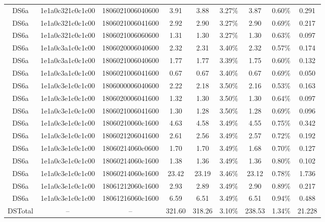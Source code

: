 \begin{tabular}{|c|c c|c|c c|c c|c|}
  DS6a & 1e1a0c321c0c1c00 & 1806021006040600 & 3.91 & 3.88 & 3.27\% & 3.87 & 0.60\% & 0.291 \\
  DS6a & 1e1a0c321c0c1c00 & 1806021006041600 & 2.92 & 2.90 & 3.27\% & 2.90 & 0.69\% & 0.217 \\
  DS6a & 1e1a0c321c0c1c00 & 1806021006060600 & 1.31 & 1.30 & 3.27\% & 1.30 & 0.63\% & 0.097 \\
  DS6a & 1e1a0c3a1c0c1c00 & 1806020006040600 & 2.32 & 2.31 & 3.40\% & 2.32 & 0.57\% & 0.174 \\
  DS6a & 1e1a0c3a1c0c1c00 & 1806021006040600 & 1.77 & 1.77 & 3.39\% & 1.75 & 0.60\% & 0.132 \\
  DS6a & 1e1a0c3a1c0c1c00 & 1806021006041600 & 0.67 & 0.67 & 3.40\% & 0.67 & 0.69\% & 0.050 \\
  DS6a & 1e1a0c3e1c0c1c00 & 1806000006040600 & 2.22 & 2.18 & 3.50\% & 2.16 & 0.53\% & 0.163 \\
  DS6a & 1e1a0c3e1c0c1c00 & 1806020006041600 & 1.32 & 1.30 & 3.50\% & 1.30 & 0.64\% & 0.097 \\
  DS6a & 1e1a0c3e1c0c1c00 & 1806021006041600 & 1.30 & 1.28 & 3.50\% & 1.28 & 0.69\% & 0.096 \\
  DS6a & 1e1a0c3e1c0c1c00 & 18060210060c1600 & 4.63 & 4.58 & 3.49\% & 4.55 & 0.75\% & 0.342 \\
  DS6a & 1e1a0c3e1c0c1c00 & 1806021206041600 & 2.61 & 2.56 & 3.49\% & 2.57 & 0.72\% & 0.192 \\
  DS6a & 1e1a0c3e1c0c1c00 & 18060214060c0600 & 1.70 & 1.70 & 3.49\% & 1.68 & 0.70\% & 0.127 \\
  DS6a & 1e1a0c3e1c0c1c00 & 18060214060c1600 & 1.38 & 1.36 & 3.49\% & 1.36 & 0.80\% & 0.102 \\
  DS6a & 1e1a0c3e1c0c1c00 & 18060214060e1600 & 23.42 & 23.19 & 3.46\% & 23.12 & 0.78\% & 1.736 \\
  DS6a & 1e1a0c3e1c0c1c00 & 18061212060c1600 & 2.93 & 2.89 & 3.49\% & 2.90 & 0.89\% & 0.217 \\
  DS6a & 1e1a0c3e1c0c1c00 & 18061216060c1600 & 6.59 & 6.51 & 3.49\% & 6.51 & 0.94\% & 0.488 \\
  DSTotal & -- & -- & 321.60 & 318.26 & 3.10\% & 238.53 & 1.34\% & 21.228 \\
\hline
\end{tabular}
